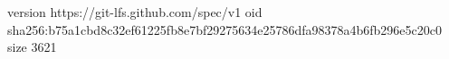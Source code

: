 version https://git-lfs.github.com/spec/v1
oid sha256:b75a1cbd8c32ef61225fb8e7bf29275634e25786dfa98378a4b6fb296e5c20c0
size 3621
